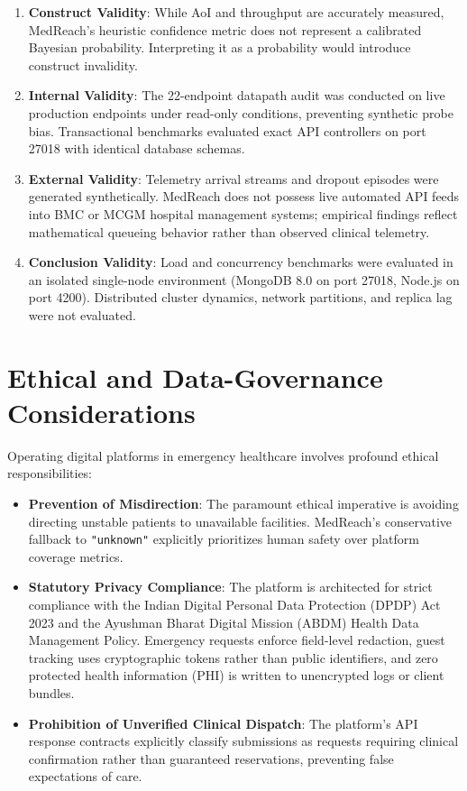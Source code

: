 \documentclass[conference]{IEEEtran}
\begin{document}
\begin{enumerate}
    \item \textbf{Construct Validity}: While AoI and throughput are accurately measured, MedReach's heuristic confidence metric does not represent a calibrated Bayesian probability. Interpreting it as a probability would introduce construct invalidity.
    \item \textbf{Internal Validity}: The 22-endpoint datapath audit was conducted on live production endpoints under read-only conditions, preventing synthetic probe bias. Transactional benchmarks evaluated exact API controllers on port 27018 with identical database schemas.
    \item \textbf{External Validity}: Telemetry arrival streams and dropout episodes were generated synthetically. MedReach does not possess live automated API feeds into BMC or MCGM hospital management systems; empirical findings reflect mathematical queueing behavior rather than observed clinical telemetry.
    \item \textbf{Conclusion Validity}: Load and concurrency benchmarks were evaluated in an isolated single-node environment (MongoDB 8.0 on port 27018, Node.js on port 4200). Distributed cluster dynamics, network partitions, and replica lag were not evaluated.
\end{enumerate}

\section{Ethical and Data-Governance Considerations}

Operating digital platforms in emergency healthcare involves profound ethical responsibilities:
\begin{itemize}
    \item \textbf{Prevention of Misdirection}: The paramount ethical imperative is avoiding directing unstable patients to unavailable facilities. MedReach's conservative fallback to \texttt{"unknown"} explicitly prioritizes human safety over platform coverage metrics.
    \item \textbf{Statutory Privacy Compliance}: The platform is architected for strict compliance with the Indian Digital Personal Data Protection (DPDP) Act 2023 and the Ayushman Bharat Digital Mission (ABDM) Health Data Management Policy. Emergency requests enforce field-level redaction, guest tracking uses cryptographic tokens rather than public identifiers, and zero protected health information (PHI) is written to unencrypted logs or client bundles.
    \item \textbf{Prohibition of Unverified Clinical Dispatch}: The platform's API response contracts explicitly classify submissions as requests requiring clinical confirmation rather than guaranteed reservations, preventing false expectations of care.
\end{itemize}
\end{document}
